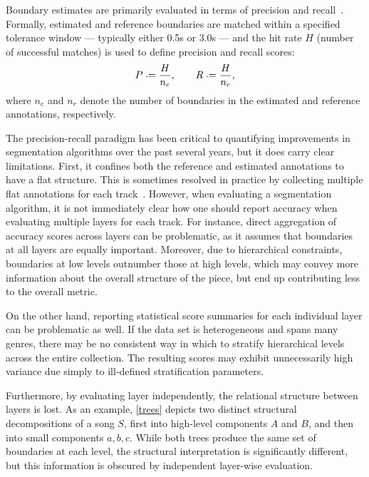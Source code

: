 \documentclass{article}
\begin{document}
Boundary estimates are primarily evaluated in terms of precision and recall~\cite{turnbull2007supervised}.  Formally, estimated and
reference boundaries are matched within a specified tolerance window --- typically either 0.5s or 3.0s --- and the hit rate $H$ (number of successful matches) 
is used to define precision and recall scores:
\begin{equation}
P \defeq \frac{H}{n_e}, \quad\quad R \defeq \frac{H}{n_r},
\end{equation}
where $n_e$ and $n_r$ denote the number of boundaries in the estimated and reference annotations, respectively.  

The precision-recall paradigm has been critical to quantifying improvements in segmentation algorithms over the past several years,
but it does carry clear limitations.  First, it confines both the reference and estimated annotations to have a flat structure.  
This is sometimes resolved in practice by collecting multiple flat annotations for each track~\cite{Smith2011}.  
However, when evaluating a segmentation algorithm, it is not immediately clear how one should report accuracy when evaluating multiple 
layers for each track.  For instance, direct aggregation of accuracy scores across layers can be problematic,
as it assumes that boundaries at all layers are equally important.  Moreover, due to hierarchical constraints, boundaries at low
levels outnumber those at high levels, which may convey more information about the overall structure of the piece, but end up 
contributing less to the overall metric.

On the other hand, reporting statistical score summaries for each individual layer can be problematic as well.  If the data set is
heterogeneous and spans many genres, there may be no consistent way in which to stratify hierarchical levels across the entire
collection. The resulting scores may exhibit unnecessarily high variance due simply to ill-defined stratification parameters.

Furthermore, by evaluating layer independently, the relational structure between layers is lost.  As an example, \cref{trees}
depicts two distinct structural decompositions of a song $S$, first into high-level components $A$ and $B$, and then into small
components $a, b, c$.  While both trees produce the same set of boundaries at each level, the structural interpretation is
significantly different, but this information is obscured by independent layer-wise evaluation.
\end{document}
